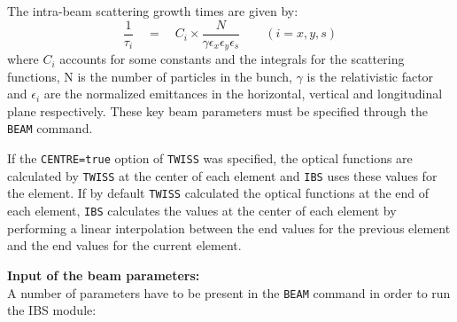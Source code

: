 The intra-beam scattering growth times are given by:
\[
 \frac{1}{\tau_i} \quad = \quad C_i \times \frac{N}{\gamma \epsilon_x
   \epsilon_y \epsilon_s} \qquad (i = x, y, s) 
\]
where $C_i$ accounts for some constants and the integrals for the
scattering functions, N is the number of particles in the bunch,
$\gamma$ is the relativistic factor and $\epsilon_i$ are the normalized
emittances in the horizontal, vertical and longitudinal plane
respectively. These key beam parameters must be specified through the
\texttt{BEAM} command. 

If the \texttt{CENTRE=true} option of \texttt{TWISS} was specified,
the optical functions are calculated by \texttt{TWISS} at the center of 
each element and \texttt{IBS} uses these values for the element. 
If by default \texttt{TWISS} calculated the optical functions at the end
of each element, \texttt{IBS} calculates the values at the center of
each element by performing a linear interpolation between the end values
for the previous element and the end values for the current element.

  
\textbf{Input of the beam parameters:}\\
A number of parameters have to be present in the  \texttt{BEAM} command
in order to run the IBS module: 

